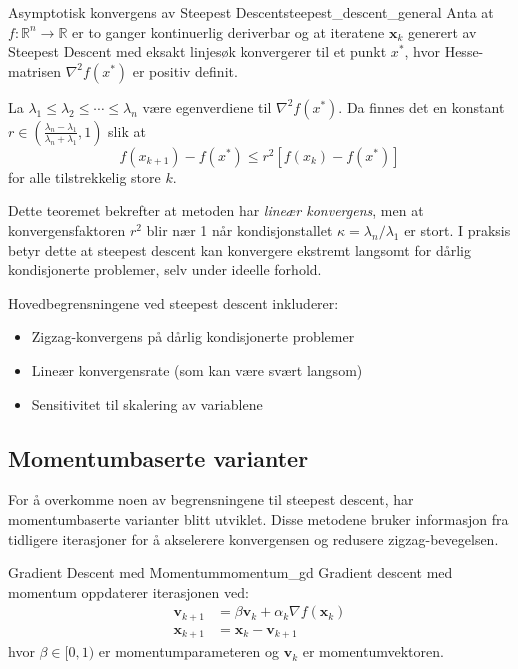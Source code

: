\begin{theorem}{Asymptotisk konvergens av Steepest Descent}{steepest_descent_general}
	Anta at \(f : \mathbb{R}^n \to \mathbb{R}\) er to ganger kontinuerlig deriverbar og at iteratene \(\symbf{x}_k\) generert av Steepest Descent med eksakt linjesøk konvergerer til et punkt \(x^\ast\), hvor Hesse-matrisen \(\nabla^2 f(x^\ast)\) er positiv definit.

	La \(\lambda_1 \leq \lambda_2 \leq \cdots \leq \lambda_n\) være egenverdiene til \(\nabla^2 f(x^\ast)\). Da finnes det en konstant \(r \in \left( \frac{\lambda_n - \lambda_1}{\lambda_n + \lambda_1}, 1 \right)\) slik at
	\[
		f(x_{k+1}) - f(x^\ast) \leq r^2 \left[ f(x_k) - f(x^\ast) \right]
	\]
	for alle tilstrekkelig store \(k\).
\end{theorem}

Dette teoremet bekrefter at metoden har \emph{lineær konvergens}, men at konvergensfaktoren \(r^2\) blir nær 1 når kondisjonstallet \(\kappa = \lambda_n / \lambda_1\) er stort. I praksis betyr dette at steepest descent kan konvergere ekstremt langsomt for dårlig kondisjonerte problemer, selv under ideelle forhold.

Hovedbegrensningene ved steepest descent inkluderer:
\begin{itemize}
	\item Zigzag-konvergens på dårlig kondisjonerte problemer
	\item Lineær konvergensrate (som kan være svært langsom)
	\item Sensitivitet til skalering av variablene
\end{itemize}

\subsection{Momentumbaserte varianter}
\label{subsec:momentum_methods}

For å overkomme noen av begrensningene til steepest descent, har momentumbaserte varianter blitt utviklet. Disse metodene bruker informasjon fra tidligere iterasjoner for å akselerere konvergensen og redusere zigzag-bevegelsen.

\begin{definition}{Gradient Descent med Momentum}{momentum_gd}
	Gradient descent med momentum oppdaterer iterasjonen ved:
	\begin{align*}
		\symbf{v}_{k+1} & = \beta \symbf{v}_k + \alpha_k \nabla f(\symbf{x}_k) \\
		\symbf{x}_{k+1} & = \symbf{x}_k - \symbf{v}_{k+1}
	\end{align*}
	hvor \(\beta \in [0, 1)\) er momentumparameteren og \(\symbf{v}_k\) er momentumvektoren.
\end{definition}

